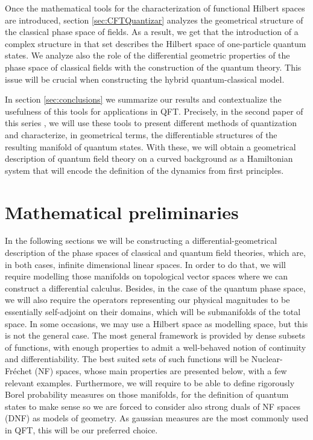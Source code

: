 \documentclass[12pt]{article}%
\begin{document}
Once the mathematical tools for the characterization of functional Hilbert spaces are introduced, section  \ref{sec:CFTQuantizar} analyzes the geometrical structure of the classical phase space of fields. As a result, we get that the introduction of a complex structure in that set  describes the Hilbert space of one-particle quantum states. We analyze also the role of the differential geometric properties of the phase space of classical fields with the construction of the quantum theory. This issue will be crucial when constructing the hybrid quantum-classical model. 

In section \ref{sec:conclusions} we summarize our results and contextualize the usefulness of this tools for applications in QFT. Precisely, in the second paper of this series \cite{alonso2023a}, we will use these tools to present different methods of quantization and characterize, in geometrical terms, the differentiable structures of the resulting manifold of quantum states. With these, we will obtain a geometrical description of quantum field theory on a curved background as a Hamiltonian system that will encode the definition of the dynamics from first principles.

\section{Mathematical preliminaries}
\label{sec:math_preliminaries}
In the following sections we will be constructing a differential-geometrical description of the phase spaces of classical and quantum field theories, which are, in both cases, infinite dimensional linear spaces. In order to do that, we will require modelling those manifolds on topological vector spaces where we can construct a differential calculus. Besides, in the case of the quantum phase space, we will also require the operators representing our physical magnitudes to be essentially self-adjoint on their domains, which will be submanifolds of the total space.  In some occasions, we may use a Hilbert space as modelling space, but this is not the general case. The most general framework is provided by dense subsets of functions, with enough properties to admit a well-behaved notion of continuity and differentiability. The best suited sets of such functions will be Nuclear-Fréchet (NF) spaces, whose main properties are presented below, with a few relevant examples. Furthermore, we will require to be able to define rigorously Borel probability measures on those manifolds, for the definition of quantum states to make sense so we are forced to consider also strong duals of NF spaces (DNF) as models of geometry. As gaussian measures are the most commonly used in QFT, this will be our preferred choice. 
\end{document}
